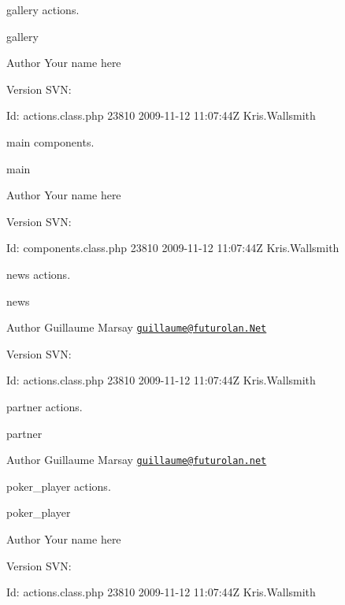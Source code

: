 gallery actions.

gallery \begin{DoxyAuthor}{Author}
Your name here 
\end{DoxyAuthor}
\begin{DoxyVersion}{Version}
S\-V\-N\-: 
\end{DoxyVersion}
\begin{DoxyParagraph}{Id\-:}
actions.\-class.\-php 23810 2009-\/11-\/12 11\-:07\-:44\-Z Kris.\-Wallsmith 
\end{DoxyParagraph}


main components.

main \begin{DoxyAuthor}{Author}
Your name here 
\end{DoxyAuthor}
\begin{DoxyVersion}{Version}
S\-V\-N\-: 
\end{DoxyVersion}
\begin{DoxyParagraph}{Id\-:}
components.\-class.\-php 23810 2009-\/11-\/12 11\-:07\-:44\-Z Kris.\-Wallsmith 
\end{DoxyParagraph}


news actions.

news \begin{DoxyAuthor}{Author}
Guillaume Marsay \href{mailto:guillaume@futurolan.Net}{\tt guillaume@futurolan.\-Net} 
\end{DoxyAuthor}
\begin{DoxyVersion}{Version}
S\-V\-N\-: 
\end{DoxyVersion}
\begin{DoxyParagraph}{Id\-:}
actions.\-class.\-php 23810 2009-\/11-\/12 11\-:07\-:44\-Z Kris.\-Wallsmith 
\end{DoxyParagraph}


partner actions.

partner \begin{DoxyAuthor}{Author}
Guillaume Marsay \href{mailto:guillaume@futurolan.net}{\tt guillaume@futurolan.\-net}
\end{DoxyAuthor}
poker\-\_\-player actions.

poker\-\_\-player \begin{DoxyAuthor}{Author}
Your name here 
\end{DoxyAuthor}
\begin{DoxyVersion}{Version}
S\-V\-N\-: 
\end{DoxyVersion}
\begin{DoxyParagraph}{Id\-:}
actions.\-class.\-php 23810 2009-\/11-\/12 11\-:07\-:44\-Z Kris.\-Wallsmith 
\end{DoxyParagraph}


